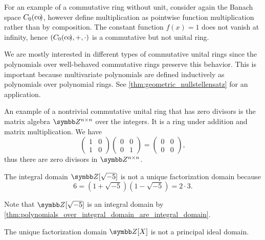 \begin{example}
\begin{description}
     For an example of a commutative ring without unit, consider again the Banach space \( C_0(\operatorname{co}\!) \), however define multiplication as pointwise function multiplication rather than by composition. The constant function \( f(x) = 1 \) does not vanish at infinity, hence \( (C_0(\operatorname{co}\!), +, \cdot) \) is a commutative but not unital ring.

     We are mostly interested in different types of commutative unital rings since the polynomials over well-behaved commutative rings preserve this behavior. This is important because multivariate polynomials are defined inductively as polynomials over polynomial rings. See \cref{thm:geometric_nullstellensatz} for an application.

    An example of a nontrivial commutative unital ring that has zero divisors is the matrix algebra \( \Z^{n \times n} \) over the integers. It is a ring under addition and matrix multiplication. We have
    \begin{equation*}
      \begin{pmatrix}
        1 & 0 \\
        1 & 0
      \end{pmatrix}
      \begin{pmatrix}
        0 & 0 \\
        0 & 1
      \end{pmatrix}
      =
      \begin{pmatrix}
        0 & 0 \\
        0 & 0
      \end{pmatrix},
    \end{equation*}
    thus there are zero divisors in \( \Z^{n \times n} \).

    \cite[388]{Knapp2016BAlg} The integral domain \( \Z[\sqrt{-5}] \) is not a unique factorization domain because
    \begin{equation*}
      6 = (1 + \sqrt{-5}) (1 - \sqrt{-5}) = 2 \cdot 3.
    \end{equation*}

    Note that \( \Z[\sqrt{-5}] \) is an integral domain by \cref{thm:polynomials_over_integral_domain_are_integral_domain}.

    \cite{ProofWiki:polynomials_in_integers_is_not_principal_ideal_domain} The unique factorization domain \( \Z[X] \) is not a principal ideal domain.


\end{description}
\end{example}
